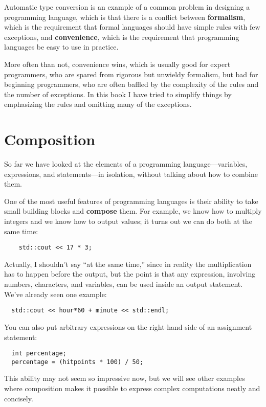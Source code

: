 Automatic type conversion is an example of a common problem in designing a
programming language, which is that there is a conflict between {\bf
formalism}, which is the requirement that formal languages should have
simple rules with few exceptions, and {\bf convenience}, which is the
requirement that programming languages be easy to use in practice.

More often than not, convenience wins, which is usually good for
expert programmers, who are spared from rigorous but unwieldy
formalism, but bad for beginning programmers, who are often baffled
by the complexity of the rules and the number of exceptions.  In this
book I have tried to simplify things by emphasizing the rules and
omitting many of the exceptions.


\section{Composition}

So far we have looked at the elements of a programming
language---variables, expressions, and statements---in
isolation, without talking about how to combine them.

One of the most useful features of programming languages
is their ability to take small building blocks and
{\bf compose} them.  For example, we know how to multiply
integers and we know how to output values; it turns out we can
do both at the same time:

\begin{verbatim}
    std::cout << 17 * 3;
\end{verbatim}
%
Actually, I shouldn't say ``at the same time,'' since in reality
the multiplication has to happen before the output, but
the point is that any expression, involving numbers, characters,
and variables, can be used inside an output statement.  We've
already seen one example:

\begin{verbatim}
  std::cout << hour*60 + minute << std::endl;
\end{verbatim}
%
You can also put arbitrary expressions on the right-hand
side of an assignment statement:

\begin{lstlisting}
  int percentage;
  percentage = (hitpoints * 100) / 50;
\end{lstlisting}
%
This ability may not seem so impressive now, but we will see
other examples where composition makes it possible
to express complex computations neatly and concisely.

